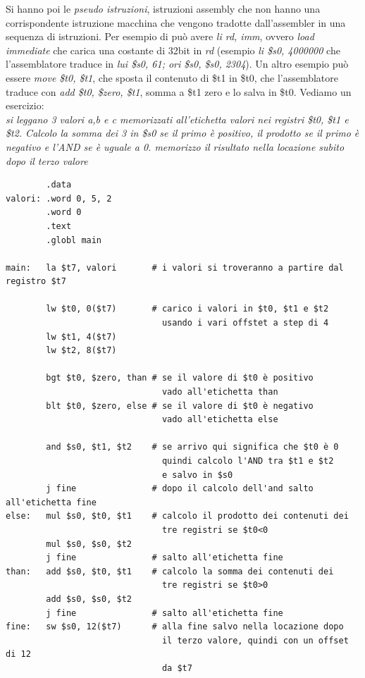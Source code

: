 \documentclass[a4paper,12pt, oneside]{book}
\begin{document}
Si hanno poi le \textit{pseudo istruzioni}, istruzioni assembly che non hanno una corrispondente istruzione macchina che vengono tradotte dall'assembler in una sequenza di istruzioni. Per esempio di può avere \textit{li rd, imm}, ovvero \textit{load immediate} che carica una costante di 32bit in \textit{rd} (esempio \textit{li \$s0, 4000000} che l'assemblatore traduce in \textit{lui \$s0, 61; ori \$s0, \$s0, 2304}). Un altro esempio può essere \textit{move \$t0, \$t1}, che sposta il contenuto di \$t1 in \$t0, che l'assemblatore traduce con \textit{add \$t0, \$zero, \$t1}, somma a \$t1 zero e lo salva in \$t0.
Vediamo un esercizio:\\
\textit{si leggano 3 valori a,b e c memorizzati all'etichetta valori nei registri \$t0, \$t1 e \$t2. Calcolo la somma dei 3 in \$s0 se il primo è positivo, il prodotto se il primo è negativo e l'AND se è uguale a 0. memorizzo il risultato nella locazione subito dopo il terzo valore}
\begin{verbatim}
        .data
valori: .word 0, 5, 2
        .word 0
        .text
        .globl main
        
main:   la $t7, valori       # i valori si troveranno a partire dal registro $t7

        lw $t0, 0($t7)       # carico i valori in $t0, $t1 e $t2
                               usando i vari offstet a step di 4
        lw $t1, 4($t7) 
        lw $t2, 8($t7)  
        
        bgt $t0, $zero, than # se il valore di $t0 è positivo
                               vado all'etichetta than
        blt $t0, $zero, else # se il valore di $t0 è negativo
                               vado all'etichetta else
        
        and $s0, $t1, $t2    # se arrivo qui significa che $t0 è 0
                               quindi calcolo l'AND tra $t1 e $t2
                               e salvo in $s0
        j fine               # dopo il calcolo dell'and salto all'etichetta fine
else:   mul $s0, $t0, $t1    # calcolo il prodotto dei contenuti dei
                               tre registri se $t0<0
        mul $s0, $s0, $t2
        j fine               # salto all'etichetta fine 
than:   add $s0, $t0, $t1    # calcolo la somma dei contenuti dei
                               tre registri se $t0>0
        add $s0, $s0, $t2
        j fine               # salto all'etichetta fine
fine:   sw $s0, 12($t7)      # alla fine salvo nella locazione dopo
                               il terzo valore, quindi con un offset di 12
                               da $t7 
\end{verbatim}
\end{document}

